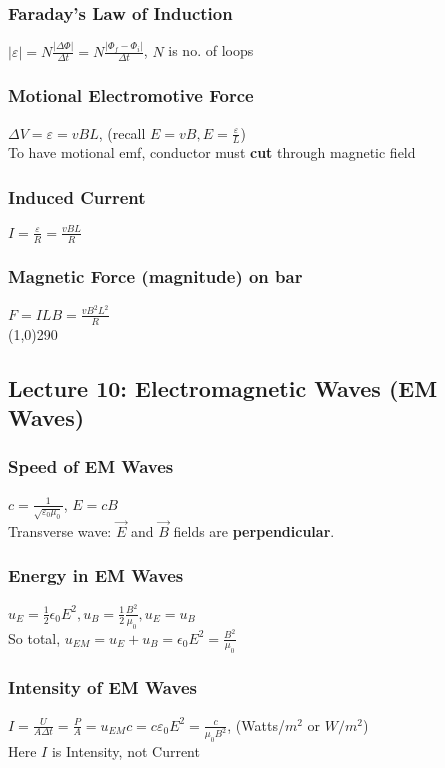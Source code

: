 \documentclass[10 pt]{article}
\begin{document}
\begin{multicols}{2}
\subsubsection*{Faraday's Law of Induction}
$|\varepsilon| = N \frac{|\Delta \Phi|}{\Delta t} = N \frac{|\Phi_{f} - \Phi_{i}|}{\Delta t}$, $N$ is no. of loops
\subsubsection*{Motional Electromotive Force}
$\Delta V = \varepsilon = vBL$, (recall $E=vB, E=\frac{\varepsilon}{L}$)\\
To have motional emf, conductor must \textbf{cut} through magnetic field
\subsubsection*{Induced Current}
$I = \frac{\varepsilon}{R} = \frac{vBL}{R}$
\subsubsection*{Magnetic Force (magnitude) on bar}
$F =ILB = \frac{vB^{2}L^{2}}{R}$
\\
\line(1,0){290}
\subsection*{Lecture 10: Electromagnetic Waves (EM Waves)}
\subsubsection*{Speed of EM Waves}
$c = \frac{1}{\sqrt{\varepsilon_{0}\mu_{0}}}$, $E=cB$ \\
Transverse wave: $\vec{E}$ and $\vec{B}$ fields are \textbf{perpendicular}. 
\subsubsection*{Energy in EM Waves}
$u_{E} = \frac{1}{2}\epsilon_{0}E^{2}, u_{B} = \frac{1}{2} \frac{B^{2}}{\mu_{0}}, u_{E} = u_{B}$ \\
So total, $u_{EM} = u_{E} + u_{B} = \epsilon_{0}E^{2} = \frac{B^{2}}{\mu_{0}}$
\subsubsection*{Intensity of EM Waves}
$I = \frac{U}{A \Delta t} = \frac{P}{A} = u_{EM}c = c\varepsilon_{0}E^{2} = \frac{c}{\mu_{0}B^{2}}$, (Watts/$m^{2}$ or $W/m^{2}$) \\ Here $I$ is Intensity, not Current

\end{multicols}
\end{document}
